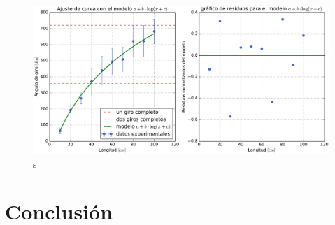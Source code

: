 \documentclass{article}
\begin{document}
\begin{figure}[ht]
    \centering
    \includegraphics[scale=0.5]{Informe/img/grafico-modelo-alogb.pdf}
    \caption{s}
    \label{fig:alogb}
\end{figure}

\section{Conclusión}




\end{document}
